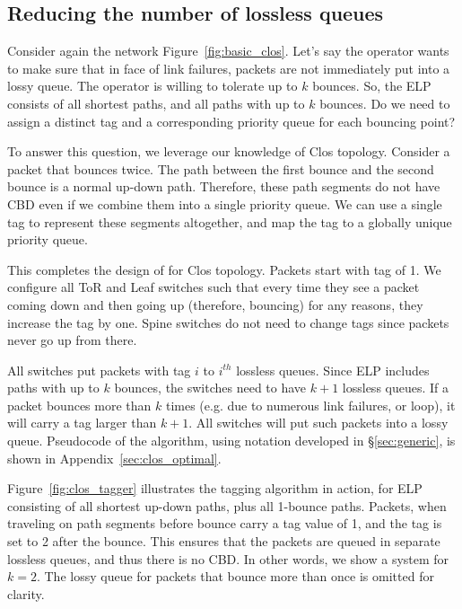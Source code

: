 \subsection{Reducing the number of lossless queues}
\label{subsec:combine}

Consider again the network Figure~\ref{fig:basic_clos}.  Let's say the operator
wants to make sure that in face of link failures, packets are not immediately
put into a lossy queue. The operator is willing to tolerate up to $k$ bounces.
So, the ELP consists of all shortest paths, and all paths with up to $k$ bounces.
Do we need to assign a distinct tag and a corresponding priority queue for each
bouncing point?

To answer this question, we leverage our knowledge of Clos topology.  Consider a
packet that bounces twice. The path between the first bounce and the second
bounce is a normal up-down path. Therefore, these path segments do not have CBD
even if we combine them into a single priority queue. We can use a single tag to
represent these segments altogether, and map the tag to a globally unique
priority queue.

This completes the design of \sysname{} for Clos topology. Packets start with
tag of 1. We configure all ToR and Leaf switches such that every time they see
a packet coming down and then going up (therefore, bouncing) for any reasons,
they increase the tag by one. Spine switches do not need to change tags since
packets never go up from there.

All switches put packets with tag $i$ to $i^{th}$ lossless queues. Since ELP
includes paths with up to $k$ bounces, the switches need to have $k+1$ lossless
queues. If a packet bounces more than $k$ times (e.g. due to numerous link
failures, or loop), it will carry a tag larger than $k+1$. All switches will put
such packets into a lossy queue.  Pseudocode of the algorithm, using notation
developed in \S\ref{sec:generic}, is shown in Appendix~\ref{sec:clos_optimal}.

Figure~\ref{fig:clos_tagger} illustrates the tagging algorithm in action, for
ELP consisting of all shortest up-down paths, plus all 1-bounce paths.
Packets, when traveling on path segments before bounce carry a tag value of 1,
and the tag is set to 2 after the bounce. This ensures that the packets are
queued in separate lossless queues, and thus there is no CBD. In other words, we
show a system for $k=2$. The lossy queue for packets that bounce more than once
is omitted for clarity. 

